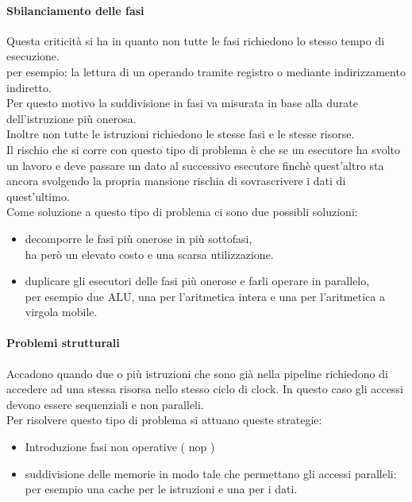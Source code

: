 \documentclass[arch.tex]{subfiles}
\begin{document}
\paragraph{Sbilanciamento delle fasi}%
\label{par:sbilanciamento_delle_fasi}
Questa criticità si ha in quanto non tutte le fasi richiedono lo stesso tempo
di esecuzione.\\
per esempio: la lettura di un operando tramite registro o mediante indirizzamento
indiretto.\\
Per questo motivo la suddivisione in fasi va misurata in base alla durate 
dell'istruzione più onerosa.\\
Inoltre non tutte le istruzioni richiedono le stesse  fasi e le stesse risorse.\\
Il rischio che si corre con questo tipo di problema è che se un esecutore ha svolto
un lavoro e deve passare un dato al successivo esecutore finchè quest'altro
sta ancora svolgendo la propria mansione rischia di sovrascrivere i dati 
di quest'ultimo.\\
Come soluzione a questo tipo di problema ci sono due possibli soluzioni:

\begin{itemize}
	\item decomporre le fasi più onerose in più sottofasi,\\
		ha però un elevato costo e una scarsa utilizzazione.
	\item duplicare gli esecutori delle fasi più onerose e farli operare in 
		parallelo,\\
		per esempio due ALU, una per l'aritmetica intera e una per
		l'aritmetica a virgola mobile.
\end{itemize}

\paragraph{Problemi strutturali}%
\label{par:problemi_strutturali}
Accadono quando due o più istruzioni che sono già nella pipeline richiedono di 
accedere ad una stessa risorsa nello stesso ciclo di clock. In questo caso 
gli accessi devono essere sequenziali e non paralleli.\\
Per risolvere questo tipo di problema si attuano queste strategie:

\begin{itemize}
	\item Introduzione fasi non operative ( nop ) 
	\item suddivisione delle memorie in modo tale che permettano gli
		accessi paralleli:\\
		per esempio una cache per le istruzioni e una per i dati.
\end{itemize}
\end{document}
